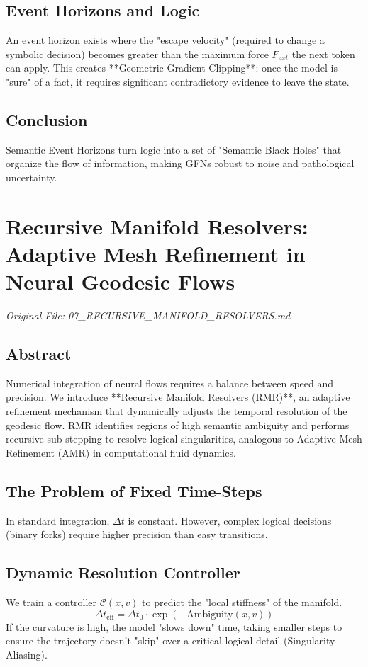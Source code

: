 \documentclass[11pt,a4paper]{report}
\begin{document}
\section{Event Horizons and Logic}
An event horizon exists where the "escape velocity" (required to change a symbolic decision) becomes greater than the maximum force $F_{ext}$ the next token can apply.
This creates **Geometric Gradient Clipping**: once the model is "sure" of a fact, it requires significant contradictory evidence to leave the state.

\section{Conclusion}
Semantic Event Horizons turn logic into a set of "Semantic Black Holes" that organize the flow of information, making GFNs robust to noise and pathological uncertainty.

\chapter{Recursive Manifold Resolvers: Adaptive Mesh Refinement in Neural Geodesic Flows}
\textit{Original File: 07\_RECURSIVE\_MANIFOLD\_RESOLVERS.md}

\section{Abstract}
Numerical integration of neural flows requires a balance between speed and precision. We introduce **Recursive Manifold Resolvers (RMR)**, an adaptive refinement mechanism that dynamically adjusts the temporal resolution of the geodesic flow. RMR identifies regions of high semantic ambiguity and performs recursive sub-stepping to resolve logical singularities, analogous to Adaptive Mesh Refinement (AMR) in computational fluid dynamics.

\section{The Problem of Fixed Time-Steps}
In standard integration, $\Delta t$ is constant. However, complex logical decisions (binary forks) require higher precision than easy transitions.

\section{Dynamic Resolution Controller}
We train a controller $\mathcal{C}(x, v)$ to predict the "local stiffness" of the manifold.
\begin{equation}
    \Delta t_{\text{eff}} = \Delta t_0 \cdot \exp(-\text{Ambiguity}(x, v))
\end{equation}
If the curvature is high, the model "slows down" time, taking smaller steps to ensure the trajectory doesn't "skip" over a critical logical detail (Singularity Aliasing).
\end{document}
